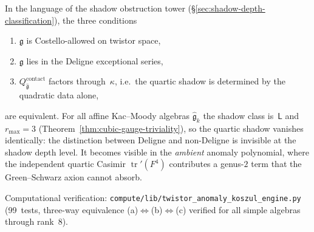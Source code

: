 \begin{remark}
\label{rem:ht-twistor-shadow}
In the language of the shadow obstruction tower
(\S\ref{sec:shadow-depth-classification}), the three
conditions
\begin{enumerate}[label=\textup{(\alph*)}]
\item $\mathfrak{g}$ is Costello-allowed on twistor space,
\item $\mathfrak{g}$ lies in the Deligne exceptional series,
\item $Q^{\mathrm{contact}}_{\widehat{\mathfrak{g}}}$
 factors through~$\kappa$, i.e.\
 the quartic shadow is determined by the quadratic data alone,
\end{enumerate}
are equivalent.
For all affine Kac--Moody algebras
$\widehat{\mathfrak{g}}_k$ the shadow class is~$\mathsf{L}$
and $r_{\max} = 3$
(Theorem~\ref{thm:cubic-gauge-triviality}), so
the quartic shadow vanishes identically: the distinction
between Deligne and non-Deligne is invisible at the shadow
depth level. It becomes visible in the \emph{ambient}
anomaly polynomial, where the independent quartic Casimir
$\operatorname{tr}'(F^4)$ contributes a genus-$2$ term
that the Green--Schwarz axion cannot absorb.

Computational verification:
\texttt{compute/lib/twistor\_anomaly\_koszul\_engine.py}
(99~tests, three-way equivalence
\textup{(a)}$\Leftrightarrow$\textup{(b)}$\Leftrightarrow$\textup{(c)}
verified for all simple algebras through rank~$8$).
\end{remark}

